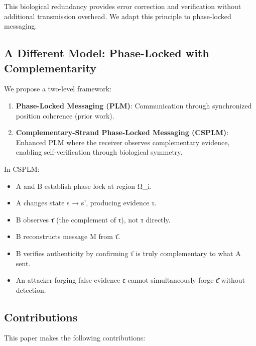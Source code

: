 \documentclass[11pt,a4paper]{article}
\theoremstyle{definition}
\begin{document}
This biological redundancy provides error correction and verification without additional transmission overhead. We adapt this principle to phase-locked messaging.

\subsection{A Different Model: Phase-Locked with Complementarity}

We propose a two-level framework:

\begin{enumerate}
\item \textbf{Phase-Locked Messaging (PLM)}: Communication through synchronized position coherence (prior work).
\item \textbf{Complementary-Strand Phase-Locked Messaging (CSPLM)}: Enhanced PLM where the receiver observes complementary evidence, enabling self-verification through biological symmetry.
\end{enumerate}

In CSPLM:
\begin{itemize}
\item A and B establish phase lock at region Ω_i.
\item A changes state s → s', producing evidence τ.
\item B observes τ̄ (the complement of τ), not τ directly.
\item B reconstructs message M from τ̄.
\item B verifies authenticity by confirming τ̄ is truly complementary to what A sent.
\item An attacker forging false evidence ε cannot simultaneously forge ε̄ without detection.
\end{itemize}

\subsection{Contributions}

This paper makes the following contributions:
\end{document}
